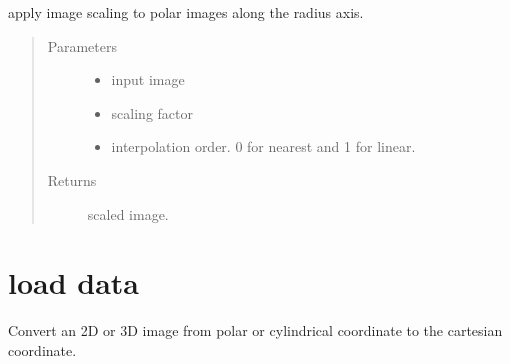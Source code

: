 \documentclass[letterpaper,10pt,english]{sphinxmanual}
\begin{document}

\begin{fulllineitems}
\label{\detokenize{index:util.load_batch.polar_zoom}}
apply image scaling to polar images along the radius axis.
\begin{quote}\begin{description}
\item[{Parameters}] \leavevmode\begin{itemize}
\item {} 
 \textendash{} input image

\item {} 
 \textendash{} scaling factor

\item {} 
 \textendash{} interpolation order.  0 for nearest and 1 for linear.

\end{itemize}

\item[{Returns}] \leavevmode
scaled image.

\end{description}\end{quote}

\end{fulllineitems}



\section{load data}
\label{\detokenize{index:module-util.load_data}}\label{\detokenize{index:load-data}}
Convert an 2D or 3D image from polar or cylindrical coordinate to the
cartesian coordinate.
\end{document}
